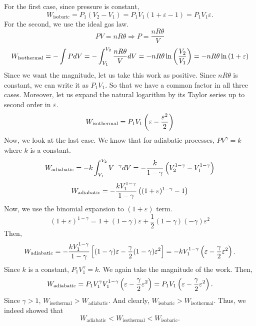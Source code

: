         For the first case, since pressure is constant,
        \begin{equation}
            W_\text{isobaric} = P_1(V_2-V_1) = P_1V_1(1+\varepsilon-1) = P_1V_1\varepsilon.
        \end{equation}
        For the second, we use the ideal gas law.
        \begin{equation}
            PV=nR\theta \Rightarrow P = \frac{nR\theta}{V}
        \end{equation}
        \begin{equation}
            W_\text{isothermal} = -\int P dV = -\int_{V_1}^{V_2}\frac{nR\theta}{V}dV = -nR\theta\ln\left( \frac{V_2}{V_1} \right) = -nR\theta\ln\left( 1+\varepsilon \right)
        \end{equation}
        Since we want the magnitude, let us take this work as positive. Since $nR\theta$ is constant, we can write it as $P_1V_1$. So that we have a common factor in all three cases. Moreover, let us expand the natural logarithm by its Taylor series up to second order in $\varepsilon$.
        \begin{equation}
            W_\text{isothermal} = P_1V_1\left( \varepsilon-\frac{\varepsilon^2}{2} \right)
        \end{equation}
        Now, we look at the last case. We know that for adiabatic processes, $PV^\gamma = k$ where $k$ is a constant. 
        \begin{equation}
            W_\text{adiabatic} = -k\int_{V_1}^{V_2}V^{-\gamma}dV=-\frac{k}{1-\gamma}\left( V_2^{1-\gamma}-V_1^{1-\gamma} \right)
        \end{equation}
        \begin{equation}
            W_\text{adiabatic} = -\frac{kV_1^{1-\gamma}}{1-\gamma}\left( (1+\varepsilon)^{1-\gamma}-1 \right)
        \end{equation}
        Now, we use the binomial expansion to $(1+\varepsilon)$ term. 
        \begin{equation}
            (1+\varepsilon)^{1-\gamma} = 1+(1-\gamma)\varepsilon+\frac{1}{2}(1-\gamma)(-\gamma)\varepsilon^2
        \end{equation}
        Then, 
        \begin{equation}
            W_\text{adiabatic} = -\frac{kV_1^{1-\gamma}}{1-\gamma}\left[ (1-\gamma)\varepsilon-\frac{\gamma}{2}(1-\gamma)\varepsilon^2 \right]=-kV_1^{1-\gamma}\left( \varepsilon-\frac{\gamma}{2}\varepsilon^2 \right).
        \end{equation}
        Since $k$ is a constant, $P_1V_1^{\gamma}=k$. We again take the magnitude of the work. Then,
        \begin{equation}
            W_\text{adiabatic} = P_1V_1^\gamma V_1^{1-\gamma}\left( \varepsilon-\frac{\gamma}{2}\varepsilon^2 \right) = P_1V_1\left( \varepsilon-\frac{\gamma}{2}\varepsilon^2 \right).
        \end{equation}
        Since $\gamma>1$, $W_\text{isothermal}>W_\text{adiabatic}$. And clearly, $W_\text{isobaric}>W_\text{isothermal}$. Thus, we indeed showed that
        \begin{equation}
            W_\text{adiabatic}<W_\text{isothermal}<W_\text{isobaric}.
        \end{equation}